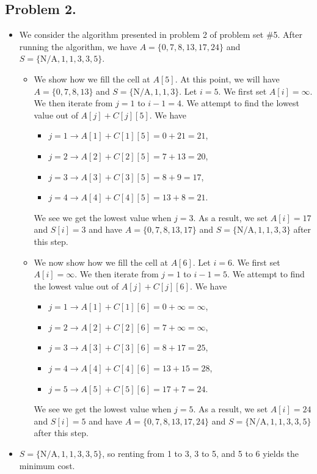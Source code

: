 \documentclass[11pt, letterpaper, titlepage]{article}
\begin{document}
\subsection*{Problem 2.}
\begin{itemize}
    \item We consider the algorithm presented in problem 2 of problem set \#5. After running the algorithm, we have $A = \{0, 7, 8, 13, 17, 24\}$ and $S = \{\text{N/A}, 1, 1, 3, 3, 5\}$.
    
    \begin{itemize}
        \item We show how we fill the cell at $A[5]$. At this point, we will have $A = \{0, 7, 8, 13\}$ and $S = \{\text{N/A}, 1, 1, 3\}$. Let $i = 5$. We first set $A[i] = \infty$. We then iterate from $j = 1$ to $i - 1 = 4$. We attempt to find the lowest value out of $A[j] + C[j][5]$. We have
        \begin{itemize}
            \item $j = 1 \longrightarrow A[1] + C[1][5] = 0 + 21 = 21$,
            \item $j = 2 \longrightarrow A[2] + C[2][5] = 7 + 13 = 20$,
            \item $j = 3 \longrightarrow A[3] + C[3][5] = 8 + 9 = 17$,
            \item $j = 4 \longrightarrow A[4] + C[4][5] = 13 + 8 = 21$.
        \end{itemize}
        We see we get the lowest value when $j = 3$. As a result, we set $A[i] = 17$ and $S[i] = 3$ and have $A = \{0, 7, 8, 13, 17\}$ and $S = \{\text{N/A}, 1, 1, 3, 3\}$ after this step.

        \item We now show how we fill the cell at $A[6]$. Let $i = 6$. We first set $A[i] = \infty$. We then iterate from $j = 1$ to $i - 1 = 5$. We attempt to find the lowest value out of $A[j] + C[j][6]$. We have
        \begin{itemize}
            \item $j = 1 \longrightarrow A[1] + C[1][6] = 0 + \infty = \infty$,
            \item $j = 2 \longrightarrow A[2] + C[2][6] = 7 + \infty = \infty$,
            \item $j = 3 \longrightarrow A[3] + C[3][6] = 8 + 17 = 25$,
            \item $j = 4 \longrightarrow A[4] + C[4][6] = 13 + 15 = 28$,
            \item $j = 5 \longrightarrow A[5] + C[5][6] = 17 + 7 = 24$.
        \end{itemize}
        We see we get the lowest value when $j = 5$. As a result, we set $A[i] = 24$ and $S[i] = 5$ and have $A = \{0, 7, 8, 13, 17, 24\}$ and $S = \{\text{N/A}, 1, 1, 3, 3, 5\}$ after this step.
    \end{itemize}

    \item $S = \{\text{N/A}, 1, 1, 3, 3, 5\}$, so renting from 1 to 3, 3 to 5, and 5 to 6 yields the minimum cost.
\end{itemize}
\end{document}
